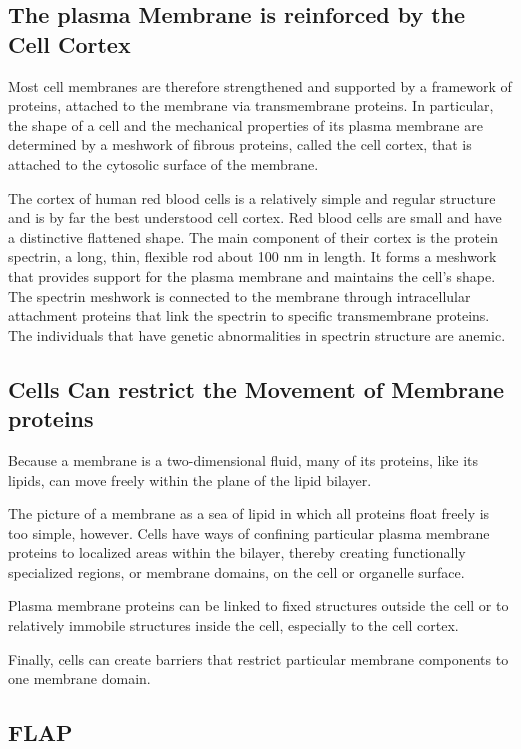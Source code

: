 \subsection{The plasma Membrane is reinforced by the Cell Cortex}

Most cell membranes are therefore strengthened
and supported by a framework of proteins, attached to the membrane
via transmembrane proteins. In particular, the shape of a cell and the
mechanical properties of its plasma membrane are determined by a
meshwork of fibrous proteins, called the cell cortex, that is attached to the
cytosolic surface of the membrane.

The cortex of human red blood cells is a relatively simple and regular
structure and is by far the best understood cell cortex. Red blood cells
are small and have a distinctive flattened shape.
The main
component of their cortex is the protein spectrin, a long, thin, flexible
rod about 100 nm in length. It forms a meshwork that provides support
for the plasma membrane and maintains the cell’s shape. The spectrin
meshwork is connected to the membrane through intracellular attachment
proteins that link the spectrin to specific transmembrane proteins.
The individuals that have genetic abnormalities in spectrin structure are anemic.

\subsection{Cells Can restrict the Movement of Membrane proteins}

Because a membrane is a two-dimensional fluid, many of its proteins, like
its lipids, can move freely within the plane of the lipid bilayer.

The picture of a membrane as a sea of lipid in which all proteins float
freely is too simple, however. Cells have ways of confining particular
plasma membrane proteins to localized areas within the bilayer, thereby
creating functionally specialized regions, or membrane domains, on the
cell or organelle surface.

Plasma membrane proteins can be linked to fixed structures outside the cell
or to relatively immobile structures inside the cell, especially to the cell cortex.

Finally, cells can create barriers that restrict particular membrane components
to one membrane domain.

\subsection{FLAP}

